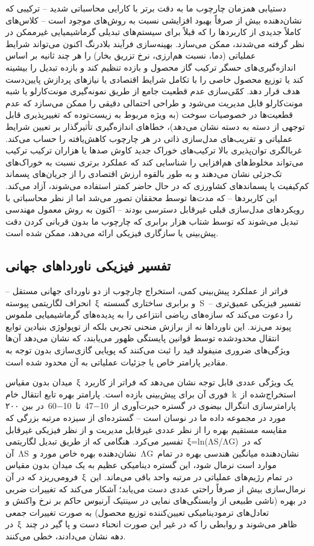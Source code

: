 \documentclass[12pt, a4paper]{article}
\begin{document}
دستیابی همزمان چارچوب ما به دقت برتر با کارایی محاسباتی شدید – ترکیبی که نشان‌دهنده بیش از صرفاً بهبود افزایشی نسبت به روش‌های موجود است – کلاس‌های کاملاً جدیدی از کاربردها را که قبلاً برای سیستم‌های تبدیلی گرماشیمیایی غیرممکن در نظر گرفته می‌شدند، ممکن می‌سازد. بهینه‌سازی فرآیند بلادرنگ اکنون می‌تواند شرایط عملیاتی (دما، نسبت هم‌ارزی، نرخ تزریق بخار) را هر چند ثانیه بر اساس اندازه‌گیری‌های حسگر ترکیب گاز محصول و بازده تنظیم کند و بازده تبدیل را بیشینه کند یا توزیع محصول خاصی را با تکامل شرایط اقتصادی یا نیازهای پردازش پایین‌دست هدف قرار دهد. کمّی‌سازی عدم قطعیت جامع از طریق نمونه‌گیری مونت‌کارلو یا شبه مونت‌کارلو قابل مدیریت می‌شود و طراحی احتمالی دقیقی را ممکن می‌سازد که عدم قطعیت‌ها در خصوصیات سوخت (به ویژه مربوط به زیست‌توده که تغییرپذیری قابل توجهی از دسته به دسته نشان می‌دهد)، خطاهای اندازه‌گیری تأثیرگذار بر تعیین شرایط عملیاتی و تقریب‌های مدل‌سازی ذاتی در هر چارچوب کاهش‌یافته را حساب می‌کند. غربالگری توان‌پذیری بالا ترکیب‌های خوراک جدید کاوش صدها یا هزاران ترکیب ترکیب می‌تواند مخلوط‌های هم‌افزایی را شناسایی کند که عملکرد برتری نسبت به خوراک‌های تک‌جزئی نشان می‌دهند و به طور بالقوه ارزش اقتصادی را از جریان‌های پسماند کم‌کیفیت یا پسماندهای کشاورزی که در حال حاضر کمتر استفاده می‌شوند، آزاد می‌کند. این کاربردها – که مدت‌ها توسط محققان تصور می‌شد اما از نظر محاسباتی با رویکردهای مدل‌سازی قبلی غیرقابل دسترسی بودند – اکنون به روش معمول مهندسی تبدیل می‌شوند که توسط شتاب هزار برابری که چارچوب ما بدون قربانی کردن دقت پیش‌بینی یا سازگاری فیزیکی ارائه می‌دهد، ممکن شده است.

\subsection{تفسیر فیزیکی ناورداهای جهانی}

فراتر از عملکرد پیش‌بینی کمی، استخراج چارچوب از دو ناوردای جهانی مستقل – انحراف لگاریتمی پیوسته ξ و برابری ساختاری گسسته S – تفسیر فیزیکی عمیق‌تری را دعوت می‌کند که سازه‌های ریاضی انتزاعی را به پدیده‌های گرماشیمیایی ملموس پیوند می‌زند. این ناورداها نه از برازش منحنی تجربی بلکه از توپولوژی بنیادین توابع انتقال محدودشده توسط قوانین پایستگی ظهور می‌یابند، که نشان می‌دهد آن‌ها ویژگی‌های ضروری منیفولد قید را ثبت می‌کنند که پویایی گازی‌سازی بدون توجه به مقادیر پارامتر خاص یا جزئیات عملیاتی به آن محدود شده است.

میدان بدون مقیاس ξ یک ویژگی عددی قابل توجه نشان می‌دهد که فراتر از کاربرد فوری آن برای پیش‌بینی بازده است. پارامتر بهره تابع انتقال خام k استخراج‌شده از پارامترسازی انتگرال بیضوی در گستره حیرت‌آوری از 10−47 تا 10−60 در بین ۲۰۰ مورد در مجموعه داده ما در نوسان است – گسترده‌ای از سیزده مرتبه بزرگی که مقایسه مستقیم بهره را از نظر عددی غیرقابل مدیریت و از نظر فیزیکی غیرقابل تفسیر می‌کرد. هنگامی که از طریق تبدیل لگاریتمی ξ=ln(ΛS/ΛG) که در آن ΛS نشان‌دهنده بهره خاص مورد و ΛG نشان‌دهنده میانگین هندسی بهره در تمام موارد است نرمال شود، این گستره دینامیکی عظیم به یک میدان بدون مقیاس فرومی‌ریزد که در آن ξ در تمام رژیم‌های عملیاتی در مرتبه واحد باقی می‌ماند. این نرمال‌سازی بیش از صرفاً راحتی عددی دست می‌یابد؛ آشکار می‌کند که تغییرات ضربی در بهره (ناشی طبیعی از وابستگی‌های نمایی در سینتیک آرنیوس حاکم بر نرخ واکنش و تعادل‌های ترمودینامیکی تعیین‌کننده توزیع محصول) به صورت تغییرات جمعی در ξ ظاهر می‌شوند و روابطی را که در غیر این صورت انحناء دست و پا گیر در چند دهه نشان می‌دادند، خطی می‌کنند.
\end{document}
